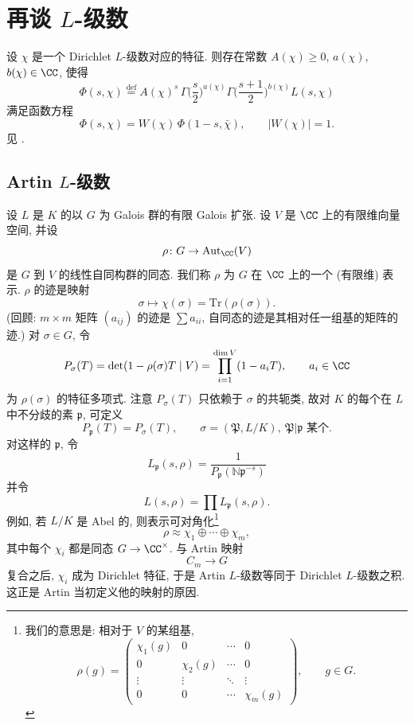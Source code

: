 \section{再谈 \texorpdfstring{$L$}{L}-级数}\label{sec:VIII.10}

设 $\chi$ 是一个 Dirichlet $L$-级数对应的特征. 则存在常数 $A(\chi)\ge 0$, $a(\chi)$, $b(\chi)\in\CC$, 使得
\[
\Phi(s,\chi)\overset{\text{def}}{=}A(\chi)^{s}\,\Gamma\Big(\frac{s}{2}\Big)^{a(\chi)}\Gamma\Big(\frac{s+1}{2}\Big)^{b(\chi)}L(s,\chi)
\]
满足函数方程
\[
\Phi(s,\chi)=W(\chi)\,\Phi(1-s,\bar{\chi}),\qquad |W(\chi)|=1.
\]
见 \cite{Narkiewicz1990}.

\subsection*{Artin $L$-级数}

设 $L$ 是 $K$ 的以 $G$ 为 Galois 群的有限 Galois 扩张. 设 $V$ 是 $\CC$ 上的有限维向量空间, 并设
\[
\rho\colon G\to\mathrm{Aut}_{\CC}(V)
\]
是 $G$ 到 $V$ 的线性自同构群的同态. 我们称 $\rho$ 为 $G$ 在 $\CC$ 上的一个 (有限维) 表示. $\rho$ 的迹是映射
\[
\sigma\mapsto\chi(\sigma)=\mathrm{Tr}(\rho(\sigma)).
\]
(回顾: $m\times m$ 矩阵 $(a_{ij})$ 的迹是 $\sum a_{ii}$, 自同态的迹是其相对任一组基的矩阵的迹.) 对 $\sigma\in G$, 令
\[
P_{\sigma}(T)=\det(1-\rho(\sigma)T\mid V)=\prod_{i=1}^{\dim V}(1-a_{i}T),\qquad a_{i}\in\CC
\]
为 $\rho(\sigma)$ 的特征多项式. 注意 $P_{\sigma}(T)$ 只依赖于 $\sigma$ 的共轭类, 故对 $K$ 的每个在 $L$ 中不分歧的素 $\mathfrak{p}$, 可定义
\[
P_{\mathfrak{p}}(T)=P_{\sigma}(T),\qquad \sigma=(\mathfrak{P},L/K),\ \mathfrak{P}|\mathfrak{p} \text{ 某个}.
\]
对这样的 $\mathfrak{p}$, 令
\[
L_{\mathfrak{p}}(s,\rho)=\frac{1}{P_{\mathfrak{p}}(\mathbb{N}\mathfrak{p}^{-s})}
\]
并令
\[
L(s,\rho)=\prod L_{\mathfrak{p}}(s,\rho).
\]
例如, 若 $L/K$ 是 Abel 的, 则表示可对角化\footnote{我们的意思是: 相对于 $V$ 的某组基,
\[
\rho(g)=\begin{pmatrix}
\chi_{1}(g) & 0 & \cdots & 0\\
0 & \chi_{2}(g) & \cdots & 0\\
\vdots & \vdots & \ddots & \vdots\\
0 & 0 & \cdots & \chi_{m}(g)
\end{pmatrix},\qquad g\in G.
\]}
\[
\rho\approx\chi_{1}\oplus\cdots\oplus\chi_{m},
\]
其中每个 $\chi_i$ 都是同态 $G\to\CC^{\times}$. 与 Artin 映射
\[
C_{m}\to G
\]
复合之后, $\chi_i$ 成为 Dirichlet 特征, 于是 Artin $L$-级数等同于 Dirichlet $L$-级数之积. 这正是 Artin 当初定义他的映射的原因.

